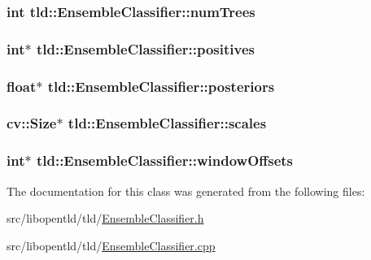 \label{classtld_1_1_ensemble_classifier_ae10dcd7614a39f9b29b3fbe957889fb9}
\hypertarget{classtld_1_1_ensemble_classifier_a60e802769e79c833d1484d96bb345b7c}{
\subsubsection[{numTrees}]{\setlength{\rightskip}{0pt plus 5cm}int {\bf tld::EnsembleClassifier::numTrees}}}
\label{classtld_1_1_ensemble_classifier_a60e802769e79c833d1484d96bb345b7c}
\hypertarget{classtld_1_1_ensemble_classifier_a572549e31f9bfc34c7b464e02aa41397}{
\subsubsection[{positives}]{\setlength{\rightskip}{0pt plus 5cm}int$\ast$ {\bf tld::EnsembleClassifier::positives}}}
\label{classtld_1_1_ensemble_classifier_a572549e31f9bfc34c7b464e02aa41397}
\hypertarget{classtld_1_1_ensemble_classifier_a34092918268be97eb1e1f2f0fc7d4254}{
\subsubsection[{posteriors}]{\setlength{\rightskip}{0pt plus 5cm}float$\ast$ {\bf tld::EnsembleClassifier::posteriors}}}
\label{classtld_1_1_ensemble_classifier_a34092918268be97eb1e1f2f0fc7d4254}
\hypertarget{classtld_1_1_ensemble_classifier_ae2ea00a933d9c96498ba756a2b4ec6b5}{
\subsubsection[{scales}]{\setlength{\rightskip}{0pt plus 5cm}cv::Size$\ast$ {\bf tld::EnsembleClassifier::scales}}}
\label{classtld_1_1_ensemble_classifier_ae2ea00a933d9c96498ba756a2b4ec6b5}
\hypertarget{classtld_1_1_ensemble_classifier_abc6ed3b991a724b07dfcc25108769e92}{
\subsubsection[{windowOffsets}]{\setlength{\rightskip}{0pt plus 5cm}int$\ast$ {\bf tld::EnsembleClassifier::windowOffsets}}}
\label{classtld_1_1_ensemble_classifier_abc6ed3b991a724b07dfcc25108769e92}


The documentation for this class was generated from the following files:\begin{DoxyCompactItemize}
\item 
src/libopentld/tld/\hyperlink{_ensemble_classifier_8h}{EnsembleClassifier.h}\item 
src/libopentld/tld/\hyperlink{_ensemble_classifier_8cpp}{EnsembleClassifier.cpp}\end{DoxyCompactItemize}
